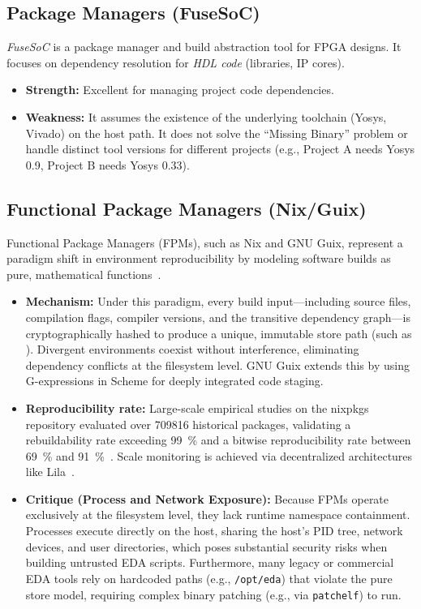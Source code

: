 \subsection{Package Managers (FuseSoC)}
\textit{FuseSoC} is a package manager and build abstraction tool for FPGA designs. It focuses on dependency resolution for \textit{HDL code} (libraries, IP cores).
\begin{itemize}
    \item \textbf{Strength:} Excellent for managing project code dependencies.
    \item \textbf{Weakness:} It assumes the existence of the underlying toolchain (Yosys, Vivado) on the host path. It does not solve the ``Missing Binary'' problem or handle distinct tool versions for different projects (e.g., Project A needs Yosys 0.9, Project B needs Yosys 0.33).
\end{itemize}

\subsection{Functional Package Managers (Nix/Guix)}
Functional Package Managers (FPMs), such as Nix and GNU Guix, represent a paradigm shift in environment reproducibility by modeling software builds as pure, mathematical functions~\cite{courtes2013functional}.
\begin{itemize}
    \item \textbf{Mechanism:} Under this paradigm, every build input---including source files, compilation flags, compiler versions, and the transitive dependency graph---is cryptographically hashed to produce a unique, immutable store path (such as \allowbreak{}). Divergent environments coexist without interference, eliminating dependency conflicts at the filesystem level. GNU Guix extends this by using G-expressions in Scheme for deeply integrated code staging.
    \item \textbf{Reproducibility rate:} Large-scale empirical studies on the nixpkgs repository evaluated over \num{709816} historical packages, validating a rebuildability rate exceeding \SI{99}{\percent} and a bitwise reproducibility rate between \SI{69}{\percent} and \SI{91}{\percent}~\cite{Malka2025DoesFunctional}. Scale monitoring is achieved via decentralized architectures like Lila~\cite{Malka2026Lila}.
    \item \textbf{Critique (Process and Network Exposure):} Because FPMs operate exclusively at the filesystem level, they lack runtime namespace containment. Processes execute directly on the host, sharing the host's PID tree, network devices, and user directories, which poses substantial security risks when building untrusted EDA scripts. Furthermore, many legacy or commercial EDA tools rely on hardcoded paths (e.g., \texttt{/opt/eda}) that violate the pure store model, requiring complex binary patching (e.g., via \texttt{patchelf}) to run.
\end{itemize}

